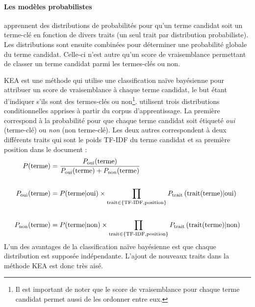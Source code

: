         \paragraph{Les modèles probabilistes}
          apprennent des distributions de probabilités pour qu'un terme candidat
          soit un terme-clé en fonction de divers traits (un seul trait par
          distribution probabiliste). Les distributions sont ensuite combinées pour
          déterminer une probabilité globale du terme candidat. Celle-ci n'est autre
          qu'un score de vraisemblance permettant de classer un terme candidat parmi
          les termes-clés ou non.

          KEA \citep{witten1999kea} est une méthode qui utilise une classification
          naïve bayésienne pour attribuer un score de vraisemblance à chaque terme
          candidat, le but étant d'indiquer s'ils sont des termes-clés ou
          non\footnote{Il est important de noter que le score de vraisemblance pour
          chaque terme candidat permet aussi de les ordonner entre eux.}.
          \citet{witten1999kea} utilisent trois distributions conditionnelles
          apprises à partir du corpus d'apprentissage. La première correspond à la
          probabilité pour que chaque terme candidat soit étiqueté \textit{oui}
          (terme-clé) ou \textit{non} (non terme-clé). Les deux autres correspondent
          à deux différents traits qui sont le poids TF-IDF du terme candidat et sa
          première position dans le document :
          \begin{align}
            P(\text{terme}) &= \frac{P_{\text{oui}}(\text{terme})}{P_{\text{oui}}(\text{terme}) + P_{\text{non}}(\text{terme})} \label{math:kea}\\
            \notag\\
            P_{\text{oui}}(\text{terme}) &= P(\text{terme} | \text{oui}) \times \prod_{\text{trait} \in \{\text{TF-IDF}, \text{position}\}} P_{\text{trait}}\left(\text{trait}(\text{terme}) | \text{oui}\right) \notag\\
            \notag\\
            P_{\text{non}}(\text{terme}) &= P(\text{terme} | \text{non}) \times \prod_{\text{trait} \in \{\text{TF-IDF}, \text{position}\}} P_{\text{trait}}\left(\text{trait}(\text{terme}) | \text{non}\right) \notag
          \end{align}
          L'un des avantages de la classification naïve bayésienne est que chaque
          distribution est supposée indépendante. L'ajout de nouveaux traits dans la
          méthode KEA est donc très aisé.
          
